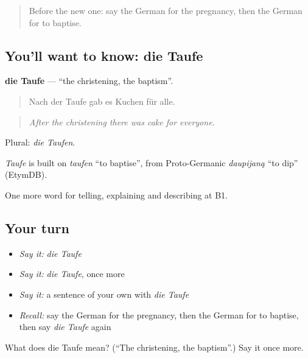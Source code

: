 \label{lesson:GE-C296-taufe}



\begin{quote}
Before the new one: say the German for the pregnancy, then the German for to baptise.
\end{quote}

\subsection*{You'll want to know: die Taufe}
\textbf{die Taufe} — \textquotedblleft{}the christening, the baptism\textquotedblright{}.

\begin{quote}
Nach der Taufe gab es Kuchen für alle.
\end{quote}

\begin{quote}
\emph{After the christening there was cake for everyone.}
\end{quote}

Plural: \emph{die Taufen}.

\begin{cousinweb}
\emph{Taufe} is built on \emph{taufen} \textquotedblleft{}to baptise\textquotedblright{}, from Proto-Germanic \emph{daupijaną} \textquotedblleft{}to dip\textquotedblright{} (EtymDB).
\end{cousinweb}

\begin{grammarlens}[title={What you've built}]
One more word for telling, explaining and describing at B1.
\end{grammarlens}

\subsection*{Your turn}
\begin{itemize}
\raggedright
  \item \emph{Say it:} \emph{die Taufe}
  \item \emph{Say it:} \emph{die Taufe}, once more
  \item \emph{Say it:} a sentence of your own with \emph{die Taufe}
  \item \emph{Recall:} say the German for the pregnancy, then the German for to baptise, then say \emph{die Taufe} again
\end{itemize}

\begin{tcolorbox}[breakable,colback=teal!4,colframe=teal!35!black,title={Before you move on}]
What does die Taufe mean? (\textquotedblleft{}The christening, the baptism\textquotedblright{}.) Say it once more.
\end{tcolorbox}
